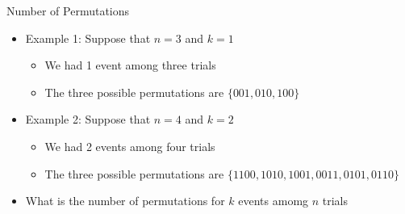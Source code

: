 \documentclass[xcolor=x11names,compress]{beamer}\usepackage[]{graphicx}\usepackage[]{color}
\begin{document}
\begin{frame}{Number of Permutations}
  \begin{itemize}
  \item Example 1: Suppose that $n=3$ and $k=1$
     \begin{itemize}
  \item We had 1 event among three trials
  \item The three possible permutations are $\{001, 010, 100\}$
  \end{itemize}
   \item Example 2: Suppose that $n=4$ and $k=2$
     \begin{itemize}
     \item We had 2 events among four trials
     \item The three possible permutations are $\{1100, 1010, 1001,0011,0101,0110\}$
     \end{itemize}
   \item What is the number of permutations for $k$ events amomg $n$ trials
  \end{itemize}
\end{frame}
\end{document}
